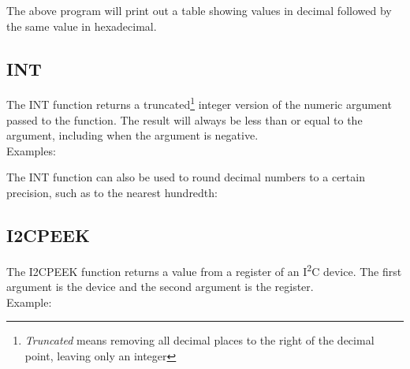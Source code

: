 
The above program will print out a table showing values in decimal followed by
the same value in hexadecimal.\\

\subsection{INT}

The {\ttfamily INT} function returns a truncated\footnote{{\em Truncated} means
removing all decimal places to the right of the decimal point, leaving only an
integer} integer version of the numeric argument passed to the function.  The
result will always be less than or equal to the argument, including when the
argument is negative.\\

Examples:\\


The {\ttfamily INT} function can also be used to round decimal numbers to a
certain precision, such as to the nearest hundredth:\\


\subsection{I2CPEEK}

The {\ttfamily I2CPEEK} function returns a value from a register of an
I\textsuperscript{2}C device.  The first argument is the device and the second
argument is the register.\\

Example:\\


